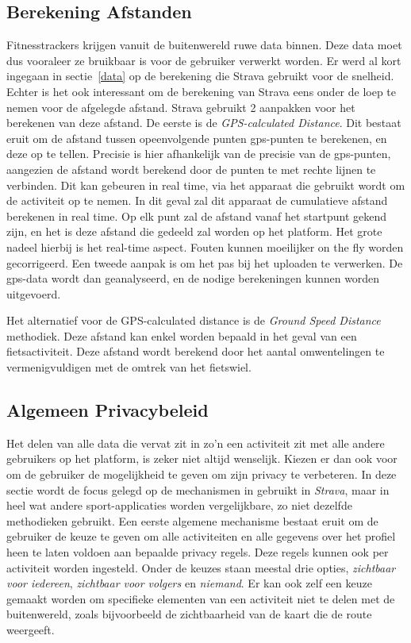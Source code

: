\subsection{Berekening Afstanden}
Fitnesstrackers krijgen vanuit de buitenwereld ruwe data binnen. Deze data moet
dus vooraleer ze bruikbaar is voor de gebruiker verwerkt worden. Er werd al
kort ingegaan in sectie~\ref{data} op de berekening die Strava gebruikt voor de
snelheid. Echter is het ook interessant om de berekening van Strava eens onder
de loep te nemen voor de afgelegde afstand. Strava gebruikt 2 aanpakken voor
het berekenen van deze afstand. De eerste is de \textit{GPS-calculated
    Distance}. Dit bestaat eruit om de afstand tussen opeenvolgende punten
gps-punten te berekenen, en deze op te tellen. Precisie is hier afhankelijk van
de precisie van de gps-punten, aangezien de afstand wordt berekend door de
punten te met rechte lijnen te verbinden. Dit kan gebeuren in real time, via
het apparaat die gebruikt wordt om de activiteit op te nemen. In dit geval zal
dit apparaat de cumulatieve afstand berekenen in real time. Op elk punt zal de
afstand vanaf het startpunt gekend zijn, en het is deze afstand die gedeeld zal
worden op het platform. Het grote nadeel hierbij is het real-time aspect.
Fouten kunnen moeilijker on the fly worden gecorrigeerd. Een tweede aanpak is
om het pas bij het uploaden te verwerken. De gps-data wordt dan geanalyseerd,
en de nodige berekeningen kunnen worden uitgevoerd.

Het alternatief voor de GPS-calculated distance is de \textit{Ground Speed
    Distance} methodiek. Deze afstand kan enkel worden bepaald in het geval van een
fietsactiviteit. Deze afstand wordt berekend door het aantal omwentelingen te
vermenigvuldigen met de omtrek van het fietswiel.~\cite{HowDista47:online}

\subsection{Algemeen Privacybeleid}\label{Algemene Privacy}
Het delen van alle data die vervat zit in zo'n een activiteit zit met alle
andere gebruikers op het platform, is zeker niet altijd wenselijk. Kiezen er
dan ook voor om de gebruiker de mogelijkheid te geven om zijn privacy te
verbeteren. In deze sectie wordt de focus gelegd op de mechanismen in gebruikt
in \textit{Strava}, maar in heel wat andere sport-applicaties worden
vergelijkbare, zo niet dezelfde methodieken gebruikt. Een eerste algemene
mechanisme bestaat eruit om de gebruiker de keuze te geven om alle activiteiten
en alle gegevens over het profiel heen te laten voldoen aan bepaalde privacy
regels. Deze regels kunnen ook per activiteit worden ingesteld. Onder de keuzes
staan meestal drie opties, \textit{zichtbaar voor iedereen}, \textit{zichtbaar
    voor volgers} en \textit{niemand}. Er kan ook zelf een keuze gemaakt worden om
specifieke elementen van een activiteit niet te delen met de buitenwereld,
zoals bijvoorbeeld de zichtbaarheid van de kaart die de route
weergeeft.\cite{Activity24:online}

